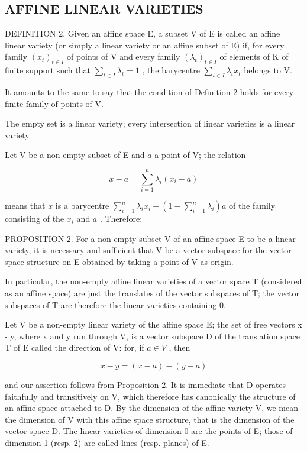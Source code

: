 \subsection{AFFINE LINEAR VARIETIES}

DEFINITION 2. Given an affine space E, a subset V of E is called an affine linear variety (or simply a linear variety or an affine subset of E) if, for every family \((x_{t})_{t\in I}\) of points of V and every family \((\lambda_t)_{t\in I}\) of elements of K of finite support such that \(\sum_{t\in I}\lambda_t = 1\) , the barycentre \(\sum_{t\in I}\lambda_t x_t\) belongs to V.

It amounts to the same to say that the condition of Definition 2 holds for every finite family of points of V.

The empty set is a linear variety; every intersection of linear varieties is a linear variety.

Let V be a non-empty subset of E and \(a\) a point of V; the relation

\[
x - a = \sum_ {i = 1} ^ {n} \lambda_ {i} (x _ {i} - a)
\]

means that \(x\) is a barycentre \(\sum_{i=1}^{n} \lambda_i x_i + \left(1 - \sum_{i=1}^{n} \lambda_i\right)a\) of the family consisting of the \(x_i\) and \(a\) . Therefore:

PROPOSITION 2. For a non-empty subset V of an affine space E to be a linear variety, it is necessary and sufficient that V be a vector subspace for the vector space structure on E obtained by taking a point of V as origin.

In particular, the non-empty affine linear varieties of a vector space T (considered as an affine space) are just the translates of the vector subspaces of T; the vector subspaces of T are therefore the linear varieties containing 0.

Let V be a non-empty linear variety of the affine space E; the set of free vectors x - y, where x and y run through V, is a vector subspace D of the translation space T of E called the direction of V: for, if \(a \in V\) , then

\[
x - y = (x - a) - (y - a)
\]

and our assertion follows from Proposition 2. It is immediate that D operates faithfully and transitively on V, which therefore has canonically the structure of an affine space attached to D. By the dimension of the affine variety V, we mean the dimension of V with this affine space structure, that is the dimension of the vector space D. The linear varieties of dimension 0 are the points of E; those of dimension 1 (resp. 2) are called lines (resp. planes) of E.

